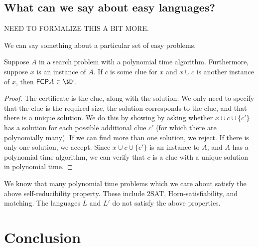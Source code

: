 \documentclass[runningheads,a4paper]{llncs}
\begin{document}
\subsection{What can we say about easy languages?}

NEED TO FORMALIZE THIS A BIT MORE.

We can say something about a particular set of easy problems. 
\begin{proposition}
Suppose $A$ in a search problem with a polynomial time algorithm. Furthermore, suppose $x$ is an instance of $A$. If $c$ is some clue for $x$ and $x \cup c$ is another instance of $x$, then $\mathsf{FCP} A \in \NP$. 
\end{proposition}

\begin{proof}
The certificate is the clue, along with the solution. We only need to specify that the clue is the required size, the solution corresponds to the clue, and that there is a unique solution. We do this by showing by asking whether $x \cup c \cup \{ c' \}$ has a solution for each possible additional clue $c'$ (for which there are polynomially many). If we can find more than one solution, we reject. If there is only one solution, we accept. Since $x \cup c \cup \{ c' \}$ is an instance to $A$, and $A$ has a polynomial time algorithm, we can verify that $c$ is a clue with a unique solution in polynomial time.
\end{proof}

We know that many polynomial time problems which we care about satisfy the above self-reducibility property. These include 2SAT, Horn-satisfiability, and matching. The languages $L$ and $L'$ do not satisfy the above properties.

\section{Conclusion}
\label{sec:conclusion}




\end{document}
